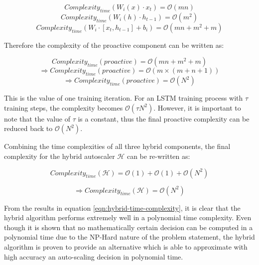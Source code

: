\[Complexity_{time}(W_{i}(x) \cdot x_{t}) = \mathcal{O}(mn)\]
\[Complexity_{time}(W_{i}(h) \cdot h_{t-1}) = \mathcal{O}(m^2)\]
\begin{equation}
    Complexity_{time}(W_{i} \cdot [x_{t}, h_{t-1}] + b_{i}) = \mathcal{O}(mn + m^2 + m)
\end{equation}

Therefore the complexity of the proactive component can be written as:

\[Complexity_{time}(proactive) = \mathcal{O}(mn + m^2 + m)\]
\[\Rightarrow Complexity_{time}(proactive) = \mathcal{O}(m \times (m + n + 1))\]
\begin{equation}
    \Rightarrow Complexity_{time}(proactive) = \mathcal{O}(N^2)
\end{equation}

This is the value of one training iteration. For an LSTM training process with $\tau$ training steps, the complexity becomes $\mathcal{O}(\tau N^2)$. However, it is important to note that the value of $\tau$ is a constant, thus the final proactive complexity can be reduced back to $\mathcal{O}(N^2)$.\par

Combining the time complexities of all three hybrid components, the final complexity for the hybrid autoscaler $\mathcal{H}$ can be re-written as:

\[Complexity_{time}(\mathcal{H}) = \mathcal{O}(1) +  \mathcal{O}(1) + \mathcal{O}(N^2)\]

\begin{equation}
    \label{eqn:hybrid-time-complexity}
    \Rightarrow Complexity_{time}(\mathcal{H}) = \mathcal{O}(N^2)
\end{equation}

From the results in equation \ref{eqn:hybrid-time-complexity}, it is clear that the hybrid algorithm performs extremely well in a polynomial time complexity. Even though it is shown that no mathematically certain decision can be computed in a polynomial time due to the NP-Hard nature of the problem statement, the hybrid algorithm is proven to provide an alternative which is able to approximate with high accuracy an auto-scaling decision in polynomial time.